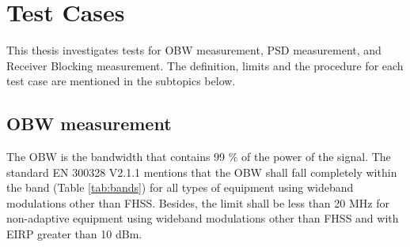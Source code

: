 \chapter{Test Cases}\label{chap:test}

This thesis investigates tests for \acf{OBW} measurement, \acf{PSD} measurement, and Receiver Blocking measurement. The definition, limits and the procedure for each test case are mentioned in the subtopics below.

\section{\acl{OBW} measurement}
\label{sec:obw}

The \acf{OBW} is the bandwidth that contains 99 \% of the power of the signal. The standard EN 300328 V2.1.1 \cite{etsi300328} mentions that the \acf{OBW} shall fall completely within the band (Table \ref{tab:bands}) for all types of equipment using wideband modulations other than \acs{FHSS}.  Besides, the limit shall be less than 20 MHz for non-adaptive equipment using wideband modulations other than \acs{FHSS} and with \acs{EIRP} greater than 10 dBm.

